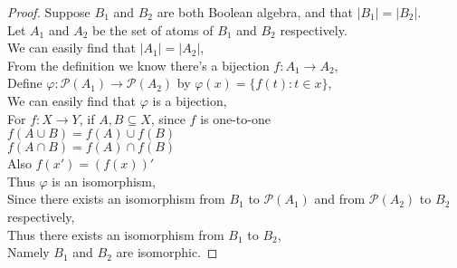 \documentclass[11pt, a4paper, UTF8]{ctexart}
\begin{document}
\begin{proof}
  Suppose $B_{1}$ and $B_{2}$ are both Boolean algebra, and that $|B_{1}| = |B_{2}|$.\\
  Let $A_{1}$ and $A_{2}$ be the set of atoms of $B_{1}$ and $B_{2}$ respectively.\\
  We can easily find that $|A_{1}| = |A_{2}|$,\\
  From the definition we know there's a bijection $f: A_{1} \rightarrow A_{2}$,\\
  Define $\varphi: \mathcal{P}(A_{1}) \rightarrow \mathcal{P}(A_{2})$ by
  $\varphi(x) = \{ f(t): t \in x \}$,\\
  We can easily find that $\varphi$ is a bijection,\\
  For $f: X \rightarrow Y$, if $A, B \subseteq X$, since $f$ is one-to-one\\
  $f(A \cup B) = f(A) \cup f(B)$\\
  $f(A \cap B) = f(A) \cap f(B)$\\
  Also $f(x') = (f(x))'$\\
  Thus $\varphi$ is an isomorphism,\\
  Since there exists an isomorphism from $B_{1}$ to $\mathcal{P}(A_{1})$ and 
  from $\mathcal{P}(A_{2})$ to $B_{2}$ respectively,\\
  Thus there exists an isomorphism from $B_{1}$ to $B_{2}$,\\
  Namely $B_{1}$ and $B_{2}$ are isomorphic.
\end{proof}




\end{document}
